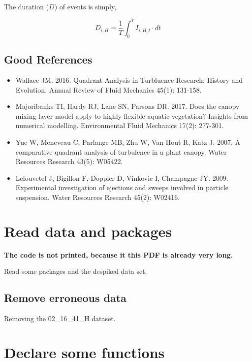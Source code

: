 \documentclass[10pt,]{article}
\begin{document}
The duration (\(D\)) of events is simply,

\[
D_{i,H} = \frac{1}{T}\int_{0}^T{I_{i,H,t}\cdot dt}
\]

\hypertarget{good-references}{%
\subsection{Good References}\label{good-references}}

\begin{itemize}
\item
  Wallace JM. 2016. Quadrant Analysis in Turbluence Research: History and Evolution. Annual Review of Fluid Mechanics 45(1): 131-158.
\item
  Majoribanks TI, Hardy RJ, Lane SN, Parsons DR. 2017. Does the canopy mixing layer model apply to highly flexible aquatic vegetation? Insights from numerical modelling. Environmental Fluid Mechanics 17(2): 277-301.
\item
  Yue W, Meneveau C, Parlange MB, Zhu W, Van Hout R, Katz J. 2007. A comparative quadrant analysis of turbulence in a plant canopy. Water Resources Research 43(5): W05422.
\item
  Lelouvetel J, Bigillon F, Doppler D, Vinkovic I, Champagne JY. 2009. Experimental investigation of ejections and sweeps involved in particle suspension. Water Resources Research 45(2): W02416.
\end{itemize}

\hypertarget{read-data-and-packages}{%
\section{Read data and packages}\label{read-data-and-packages}}

\textbf{The code is not printed, because it this PDF is already very long.}

Read some packages and the despiked data set.

\hypertarget{remove-erroneous-data}{%
\subsection{Remove erroneous data}\label{remove-erroneous-data}}

Removing the 02\_16\_41\_H dataset.

\hypertarget{declare-some-functions}{%
\section{Declare some functions}\label{declare-some-functions}}
\end{document}
